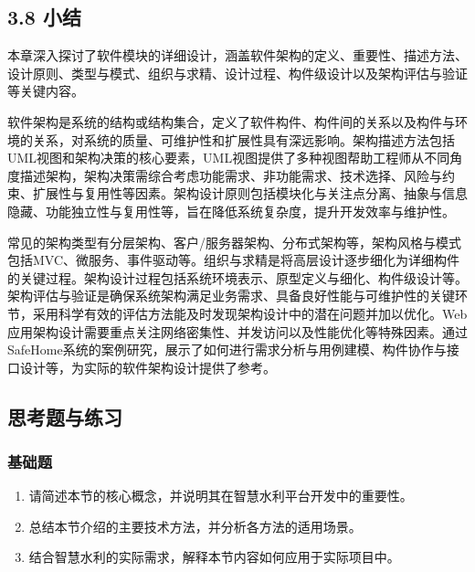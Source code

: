 \hypertarget{ux5c0fux7ed3}{%
\subsection{3.8 小结}\label{ux5c0fux7ed3}}

本章深入探讨了软件模块的详细设计，涵盖软件架构的定义、重要性、描述方法、设计原则、类型与模式、组织与求精、设计过程、构件级设计以及架构评估与验证等关键内容。

软件架构是系统的结构或结构集合，定义了软件构件、构件间的关系以及构件与环境的关系，对系统的质量、可维护性和扩展性具有深远影响。架构描述方法包括UML视图和架构决策的核心要素，UML视图提供了多种视图帮助工程师从不同角度描述架构，架构决策需综合考虑功能需求、非功能需求、技术选择、风险与约束、扩展性与复用性等因素。架构设计原则包括模块化与关注点分离、抽象与信息隐藏、功能独立性与复用性等，旨在降低系统复杂度，提升开发效率与维护性。

常见的架构类型有分层架构、客户/服务器架构、分布式架构等，架构风格与模式包括MVC、微服务、事件驱动等。组织与求精是将高层设计逐步细化为详细构件的关键过程。架构设计过程包括系统环境表示、原型定义与细化、构件级设计等。架构评估与验证是确保系统架构满足业务需求、具备良好性能与可维护性的关键环节，采用科学有效的评估方法能及时发现架构设计中的潜在问题并加以优化。Web应用架构设计需要重点关注网络密集性、并发访问以及性能优化等特殊因素。通过SafeHome系统的案例研究，展示了如何进行需求分析与用例建模、构件协作与接口设计等，为实际的软件架构设计提供了参考。

\hypertarget{ux601dux8003ux9898ux4e0eux7ec3ux4e60-3}{%
\subsection{思考题与练习}\label{ux601dux8003ux9898ux4e0eux7ec3ux4e60-3}}

\hypertarget{ux57faux7840ux9898-3}{%
\subsubsection{基础题}\label{ux57faux7840ux9898-3}}

\begin{enumerate}
\def\labelenumi{\arabic{enumi}.}
\tightlist
\item
  请简述本节的核心概念，并说明其在智慧水利平台开发中的重要性。
\item
  总结本节介绍的主要技术方法，并分析各方法的适用场景。
\item
  结合智慧水利的实际需求，解释本节内容如何应用于实际项目中。
\end{enumerate}

